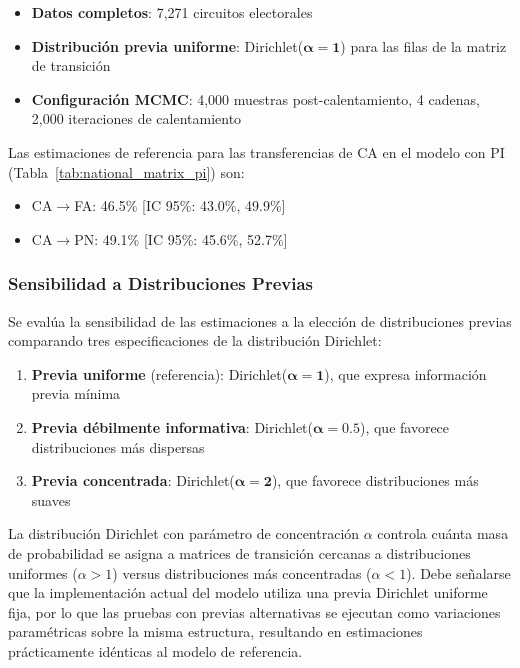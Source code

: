 \begin{itemize}
    \item \textbf{Datos completos}: 7,271 circuitos electorales
    \item \textbf{Distribución previa uniforme}: Dirichlet($\boldsymbol{\alpha} = \mathbf{1}$) para las filas de la matriz de transición
    \item \textbf{Configuración MCMC}: 4,000 muestras post-calentamiento, 4 cadenas, 2,000 iteraciones de calentamiento
\end{itemize}

Las estimaciones de referencia para las transferencias de CA en el modelo con PI (Tabla~\ref{tab:national_matrix_pi}) son:
\begin{itemize}
    \item CA$\to$FA: 46.5\% [IC 95\%: 43.0\%, 49.9\%]
    \item CA$\to$PN: 49.1\% [IC 95\%: 45.6\%, 52.7\%]
\end{itemize}

\subsubsection{Sensibilidad a Distribuciones Previas}

Se evalúa la sensibilidad de las estimaciones a la elección de distribuciones previas comparando tres especificaciones de la distribución Dirichlet:

\begin{enumerate}
    \item \textbf{Previa uniforme} (referencia): Dirichlet($\boldsymbol{\alpha} = \mathbf{1}$), que expresa información previa mínima
    \item \textbf{Previa débilmente informativa}: Dirichlet($\boldsymbol{\alpha} = \mathbf{0.5}$), que favorece distribuciones más dispersas
    \item \textbf{Previa concentrada}: Dirichlet($\boldsymbol{\alpha} = \mathbf{2}$), que favorece distribuciones más suaves
\end{enumerate}

La distribución Dirichlet con parámetro de concentración $\alpha$ controla cuánta masa de probabilidad se asigna a matrices de transición cercanas a distribuciones uniformes ($\alpha > 1$) versus distribuciones más concentradas ($\alpha < 1$). Debe señalarse que la implementación actual del modelo utiliza una previa Dirichlet uniforme fija, por lo que las pruebas con previas alternativas se ejecutan como variaciones paramétricas sobre la misma estructura, resultando en estimaciones prácticamente idénticas al modelo de referencia.


